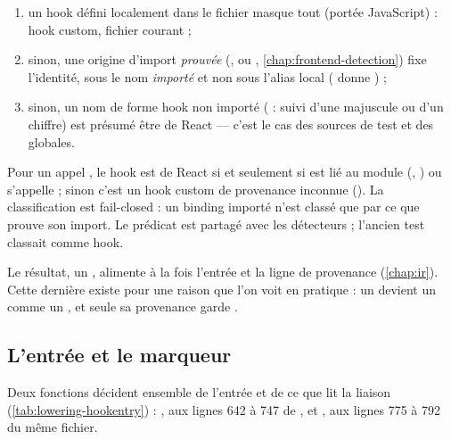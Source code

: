 \begin{enumerate}
  \item un hook défini localement dans le fichier masque tout (portée JavaScript) : hook custom, fichier courant ;
  \item sinon, une origine d'import \emph{prouvée} (,  ou , \cref{chap:frontend-detection}) fixe l'identité, sous le nom \emph{importé} et non sous l'alias local ( donne ) ;
  \item sinon, un nom de forme hook non importé ( :  suivi d'une majuscule ou d'un chiffre) est présumé être de React --- c'est le cas des sources de test et des globales.
\end{enumerate}

Pour un appel , le hook est de React si et seulement si  est lié au module  (, ) ou s'appelle  ; sinon c'est un hook custom de provenance inconnue (). La classification est \og fail-closed\fg{} : un binding importé n'est classé que par ce que prouve son import. Le prédicat  est partagé avec les détecteurs ; l'ancien test  classait  comme hook.

Le résultat, un , alimente à la fois l'entrée et la ligne de provenance  (\cref{chap:ir}). Cette dernière existe pour une raison que l'on voit en pratique : un  devient un  comme un , et seule sa provenance garde .

\subsection{L'entrée et le marqueur}

Deux fonctions décident ensemble de l'entrée et de ce que lit la liaison (\cref{tab:lowering-hookentry}) : , aux lignes 642 à 747 de , et , aux lignes 775 à 792 du même fichier.

